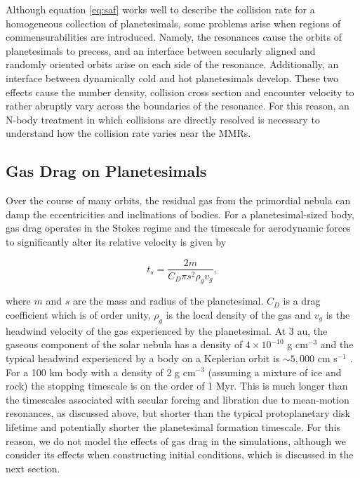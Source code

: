 \documentclass[fleqn,usenatbib]{mnras}
\begin{document}
Although equation \ref{eq:saf} works well to describe the collision rate for a homogeneous collection of planetesimals, some problems arise when regions of commensurabilities are 
introduced. Namely, the resonances cause the orbits of planetesimals to precess, and an interface between secularly aligned and randomly oriented orbits arise on each side of the 
resonance. Additionally, an interface between dynamically cold and hot planetesimals develop. These two effects cause the number density, collision cross section and encounter velocity 
to rather abruptly vary across the boundaries of the resonance. For this reason, an N-body treatment in which collisions are directly resolved is necessary to understand how the collision 
rate varies near the MMRs.

\subsection{Gas Drag on Planetesimals}\label{sec:pl_drag}

Over the course of many orbits, the residual gas from the primordial nebula can damp the eccentricities and inclinations of bodies. For a planetesimal-sized body, gas drag operates 
in the Stokes regime and the timescale for aerodynamic forces to significantly alter its relative velocity is given by \citep{1976PThPh..56.1756A}

\begin{equation}\label{eq:ts_stokes}
    t_{s} = \frac{2 m}{C_{D} \pi s^{2} \rho_{g} v_{g}},
\end{equation}

\noindent where $m$ and $s$ are the mass and radius of the planetesimal. $C_{D}$ is a drag coefficient which is of order unity, $
\rho_{g}$ is the local density of the gas and $v_{g}$ is the headwind velocity of the gas experienced by the planetesimal. At 3 au, the gaseous component of the solar nebula has a
density of $4 \times 10^{-10}$ g cm$^{-3}$ and the typical headwind experienced by a body on a Keplerian orbit is $\sim 5,000$ cm s$^{-1}$ \citep{1981PThPS..70...35H}. For a 100 km 
body with a density of 2 g cm$^{-3}$ (assuming a mixture of ice and rock) the stopping timescale is on the order of 1 Myr. This is much longer than the timescales associated with 
secular forcing and libration due to mean-motion resonances, as discussed above, but shorter than the typical protoplanetary disk lifetime and potentially shorter the planetesimal 
formation timescale. For this reason, we do not model the effects of gas drag in the simulations, although we consider its effects when constructing initial conditions, which is discussed in 
the next section.
\end{document}
